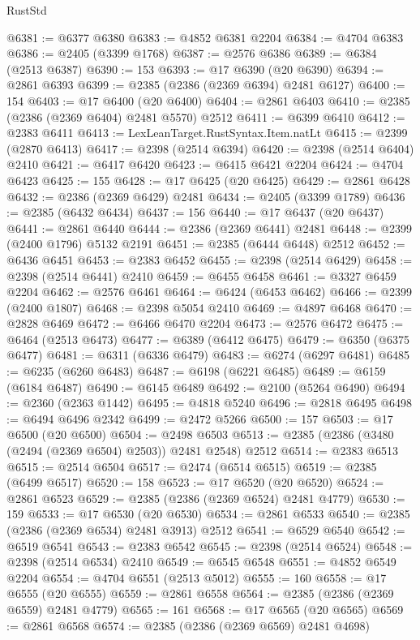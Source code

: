 \begin{lexlean}{RustStd}
\begin{coremodule}
{\begin{coremodule}
{{{{{{{{{{{{{{{{{{{{{{{{{{{{{{{{{{{{{{{{{{{{{{{{{{@6381 := @6377 @6380
@6383 := @4852 @6381 @2204
@6384 := @4704 @6383
@6386 := @2405 (@3399 @1768)
@6387 := @2576 @6386
@6389 := @6384 (@2513 @6387)
@6390 := 153
@6393 := @17 @6390 (@20 @6390)
@6394 := @2861 @6393
@6399 := @2385 (@2386 (@2369 @6394) @2481 @6127)
@6400 := 154
@6403 := @17 @6400 (@20 @6400)
@6404 := @2861 @6403
@6410 := @2385 (@2386 (@2369 @6404) @2481 @5570) @2512
@6411 := @6399 @6410
@6412 := @2383 @6411
@6413 := LexLeanTarget.RustSyntax.Item.natLt
@6415 := @2399 (@2870 @6413)
@6417 := @2398 (@2514 @6394)
@6420 := @2398 (@2514 @6404) @2410
@6421 := @6417 @6420
@6423 := @6415 @6421 @2204
@6424 := @4704 @6423
@6425 := 155
@6428 := @17 @6425 (@20 @6425)
@6429 := @2861 @6428
@6432 := @2386 (@2369 @6429) @2481
@6434 := @2405 (@3399 @1789)
@6436 := @2385 (@6432 @6434)
@6437 := 156
@6440 := @17 @6437 (@20 @6437)
@6441 := @2861 @6440
@6444 := @2386 (@2369 @6441) @2481
@6448 := @2399 (@2400 @1796) @5132 @2191
@6451 := @2385 (@6444 @6448) @2512
@6452 := @6436 @6451
@6453 := @2383 @6452
@6455 := @2398 (@2514 @6429)
@6458 := @2398 (@2514 @6441) @2410
@6459 := @6455 @6458
@6461 := @3327 @6459 @2204
@6462 := @2576 @6461
@6464 := @6424 (@6453 @6462)
@6466 := @2399 (@2400 @1807)
@6468 := @2398 @5054 @2410
@6469 := @4897 @6468
@6470 := @2828 @6469
@6472 := @6466 @6470 @2204
@6473 := @2576 @6472
@6475 := @6464 (@2513 @6473)
@6477 := @6389 (@6412 @6475)
@6479 := @6350 (@6375 @6477)
@6481 := @6311 (@6336 @6479)
@6483 := @6274 (@6297 @6481)
@6485 := @6235 (@6260 @6483)
@6487 := @6198 (@6221 @6485)
@6489 := @6159 (@6184 @6487)
@6490 := @6145 @6489
@6492 := @2100 (@5264 @6490)
@6494 := @2360 (@2363 @1442)
@6495 := @4818 @5240
@6496 := @2818 @6495
@6498 := @6494 @6496 @2342
@6499 := @2472 @5266
@6500 := 157
@6503 := @17 @6500 (@20 @6500)
@6504 := @2498 @6503
@6513 := @2385 (@2386 (@3480 (@2494 (@2369 @6504) @2503)) @2481 @2548) @2512
@6514 := @2383 @6513
@6515 := @2514 @6504
@6517 := @2474 (@6514 @6515)
@6519 := @2385 (@6499 @6517)
@6520 := 158
@6523 := @17 @6520 (@20 @6520)
@6524 := @2861 @6523
@6529 := @2385 (@2386 (@2369 @6524) @2481 @4779)
@6530 := 159
@6533 := @17 @6530 (@20 @6530)
@6534 := @2861 @6533
@6540 := @2385 (@2386 (@2369 @6534) @2481 @3913) @2512
@6541 := @6529 @6540
@6542 := @6519 @6541
@6543 := @2383 @6542
@6545 := @2398 (@2514 @6524)
@6548 := @2398 (@2514 @6534) @2410
@6549 := @6545 @6548
@6551 := @4852 @6549 @2204
@6554 := @4704 @6551 (@2513 @5012)
@6555 := 160
@6558 := @17 @6555 (@20 @6555)
@6559 := @2861 @6558
@6564 := @2385 (@2386 (@2369 @6559) @2481 @4779)
@6565 := 161
@6568 := @17 @6565 (@20 @6565)
@6569 := @2861 @6568
@6574 := @2385 (@2386 (@2369 @6569) @2481 @4698)
}}}}}}}}}}}}}}}}}}}}}}}}}}}}}}}}}}}}}}}}}}}}}}}}}}
\end{coremodule}}
\end{coremodule}
\end{lexlean}
